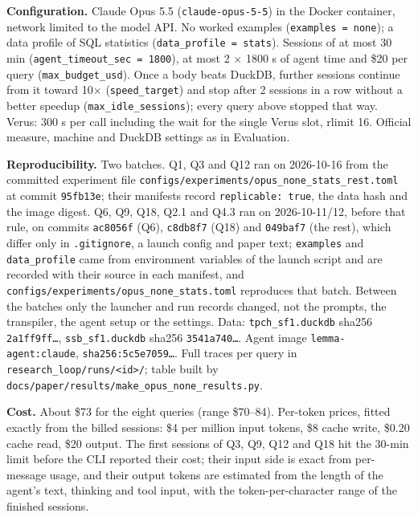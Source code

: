\documentclass[
  10pt,
]{article}
\newcounter{none} %
\begin{document}
\textbf{Configuration.} Claude Opus 5.5 (\texttt{claude-opus-5-5}) in
the Docker container, network limited to the model API. No worked
examples (\texttt{examples\ =\ none}); a data profile of SQL statistics
(\texttt{data\_profile\ =\ stats}). Sessions of at most 30 min
(\texttt{agent\_timeout\_sec\ =\ 1800}), at most 2 \ensuremath{\times} 1800 s of agent
time and \$20 per query (\texttt{max\_budget\_usd}). Once a body beats
DuckDB, further sessions continue from it toward 10\ensuremath{\times}
(\texttt{speed\_target}) and stop after 2 sessions in a row without a
better speedup (\texttt{max\_idle\_sessions}); every query above stopped
that way. Verus: 300 s per call including the wait for the single Verus
slot, rlimit 16. Official measure, machine and DuckDB settings as in
Evaluation.

\textbf{Reproducibility.} Two batches. Q1, Q3 and Q12 ran on 2026-10-16
from the committed experiment file
\texttt{configs/experiments/opus\_none\_stats\_rest.toml} at commit
\texttt{95fb13e}; their manifests record \texttt{replicable:\ true}, the
data hash and the image digest. Q6, Q9, Q18, Q2.1 and Q4.3 ran on
2026-10-11/12, before that rule, on commits \texttt{ac8056f} (Q6),
\texttt{c8db8f7} (Q18) and \texttt{049baf7} (the rest), which differ
only in \texttt{.gitignore}, a launch config and paper text;
\texttt{examples} and \texttt{data\_profile} came from environment
variables of the launch script and are recorded with their source in
each manifest, and \texttt{configs/experiments/opus\_none\_stats.toml}
reproduces that batch. Between the batches only the launcher and run
records changed, not the prompts, the transpiler, the agent setup or the
settings. Data: \texttt{tpch\_sf1.duckdb} sha256 \texttt{2a1ff9ff…},
\texttt{ssb\_sf1.duckdb} sha256 \texttt{3541a740…}. Agent image
\texttt{lemma-agent:claude}, \texttt{sha256:5c5e7059…}. Full traces per
query in \texttt{research\_loop/runs/\textless{}id\textgreater{}/};
table built by \texttt{docs/paper/results/make\_opus\_none\_results.py}.

\textbf{Cost.} About \$73 for the eight queries (range \$70--84).
Per-token prices, fitted exactly from the billed sessions: \$4 per
million input tokens, \$8 cache write, \$0.20 cache read, \$20 output.
The first sessions of Q3, Q9, Q12 and Q18 hit the 30-min limit before
the CLI reported their cost; their input side is exact from per-message
usage, and their output tokens are estimated from the length of the
agent's text, thinking and tool input, with the token-per-character
range of the finished sessions.
\end{document}
